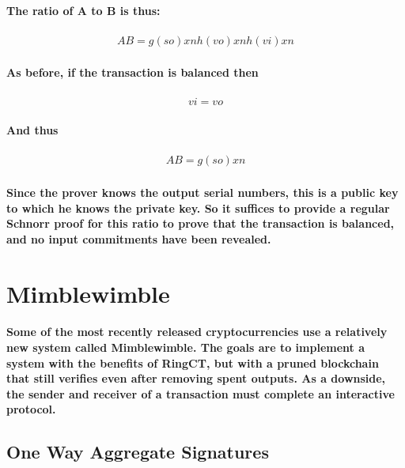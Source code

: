 \documentclass{article}
\begin{document}
\paragraph{The ratio of A to B is thus:}

\begin{eqnarray}
  AB=g( so) xnh( vo) xnh( vi) xn
\end{eqnarray}
  
\paragraph{As before, if the transaction is balanced then }

\begin{eqnarray}
  vi= vo
\end{eqnarray}

\paragraph{And thus}

\begin{eqnarray}
  AB=g( so) xn
\end{eqnarray}

\paragraph{Since the prover knows the output serial numbers, this is a public key to which he knows the private key.  So it suffices to provide a regular Schnorr proof for this ratio to prove that the transaction is balanced, and no input commitments have been revealed.}



\section{Mimblewimble}

\paragraph{Some of the most recently released cryptocurrencies use a relatively new system called Mimblewimble.  The goals are to implement a system with the benefits of RingCT, but with a pruned blockchain that still verifies even after removing spent outputs.  As a downside, the sender and receiver of a transaction must complete an interactive protocol.}


\subsection{One Way Aggregate Signatures}
\end{document}
